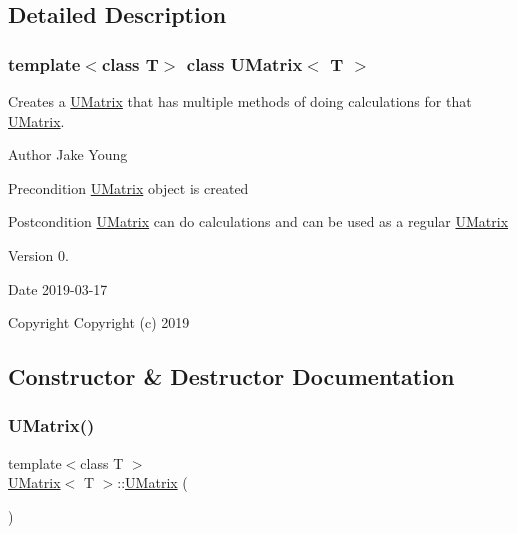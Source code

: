 \subsection{Detailed Description}
\subsubsection*{template$<$class T$>$\newline
class U\+Matrix$<$ T $>$}

Creates a \mbox{\hyperlink{class_u_matrix}{U\+Matrix}} that has multiple methods of doing calculations for that \mbox{\hyperlink{class_u_matrix}{U\+Matrix}}. 

\begin{DoxyAuthor}{Author}
Jake Young 
\end{DoxyAuthor}
\begin{DoxyPrecond}{Precondition}
\mbox{\hyperlink{class_u_matrix}{U\+Matrix}} object is created 
\end{DoxyPrecond}
\begin{DoxyPostcond}{Postcondition}
\mbox{\hyperlink{class_u_matrix}{U\+Matrix}} can do calculations and can be used as a regular \mbox{\hyperlink{class_u_matrix}{U\+Matrix}} 
\end{DoxyPostcond}
\begin{DoxyVersion}{Version}
0. 
\end{DoxyVersion}
\begin{DoxyDate}{Date}
2019-\/03-\/17
\end{DoxyDate}
\begin{DoxyCopyright}{Copyright}
Copyright (c) 2019 
\end{DoxyCopyright}


\subsection{Constructor \& Destructor Documentation}
\mbox{\label{class_u_matrix_a7c6cfdd2d26c56bca1f5b1d79e7f2ee2}} 
\subsubsection{\texorpdfstring{UMatrix()}{UMatrix()}\hspace{0.1cm}{\footnotesize\ttfamily [1/5]}}
{\footnotesize\ttfamily template$<$class T $>$ \\
\mbox{\hyperlink{class_u_matrix}{U\+Matrix}}$<$ T $>$\+::\mbox{\hyperlink{class_u_matrix}{U\+Matrix}} (\begin{DoxyParamCaption}{ }\end{DoxyParamCaption})}



